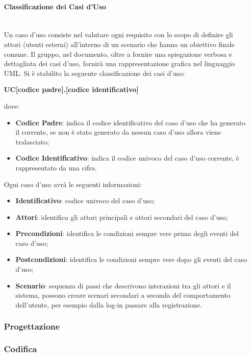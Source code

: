\paragraph{Classificazione dei Casi d'Uso} \-\\
Un caso d'uso consiste nel valutare ogni requisito con lo scopo di definire gli attori (utenti esterni) all'interno di un scenario che hanno un obiettivo finale comune. Il gruppo, nel documento, oltre a fornire una spiegazione verbosa e dettagliata dei casi d'uso, fornirà una rappresentazione grafica nel linguaggio UML.
Si è stabilito la seguente classificazione dei casi d'uso:
\begin{center}
	\textbf{UC[codice padre].[codice identificativo]}
\end{center}
dove:
\begin{itemize}
	\item \textbf{Codice Padre}: indica il codice identificativo del caso d'uso che ha generato il corrente, se non è stato generato da nessun caso d'uso allora viene tralasciato;
	\item \textbf{Codice Identificativo}: indica il codice univoco del caso d'uso corrente, è rappresentato da una cifra.
\end{itemize}
Ogni caso d'uso avrà le seguenti informazioni:
\begin{itemize}
	\item \textbf{Identificativo}: codice univoco del caso d'uso;
	\item \textbf{Attori}: identifica gli attori principali e attori secondari del caso d'uso;
	\item \textbf{Precondizioni}: identifica le condizioni sempre vere prima degli eventi del caso d'uso;
	\item \textbf{Postcondizioni}: identifica le condizioni sempre vere dopo gli eventi del caso d'uso;
	\item \textbf{Scenario}: sequenza di passi che descrivono interazioni tra gli attori e il sistema, possono creare scenari secondari a seconda del comportamento dell'utente, per esempio dalla log-in passare alla registrazione.
\end{itemize}

\subsubsection{Progettazione}\label{Progettazione}


\subsubsection{Codifica}



